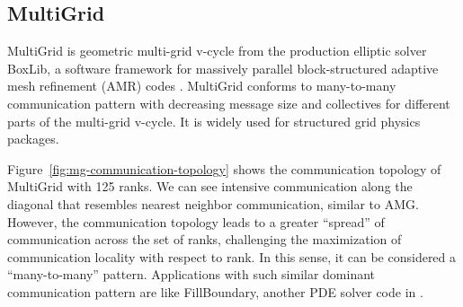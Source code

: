 
\subsection{MultiGrid}
\label{sec:multigrid}


MultiGrid is geometric multi-grid v-cycle from the production elliptic solver BoxLib, a software framework for massively parallel block-structured adaptive mesh refinement (AMR) codes \cite{boxlib}. MultiGrid conforms to many-to-many communication pattern with decreasing message size and collectives for different parts of the multi-grid v-cycle. It is widely used for structured grid physics packages. 

Figure~\ref{fig:mg-communication-topology} shows the communication topology of MultiGrid with 125 ranks. We can see intensive communication along the diagonal that resembles nearest neighbor communication, similar to AMG. However, the communication topology leads to a greater ``spread'' of communication across the set of ranks, challenging the maximization of communication locality with respect to rank. In this sense, it can be considered a ``many-to-many'' pattern. Applications with such similar dominant communication pattern are like FillBoundary, another PDE solver code in \cite{boxlib}.




